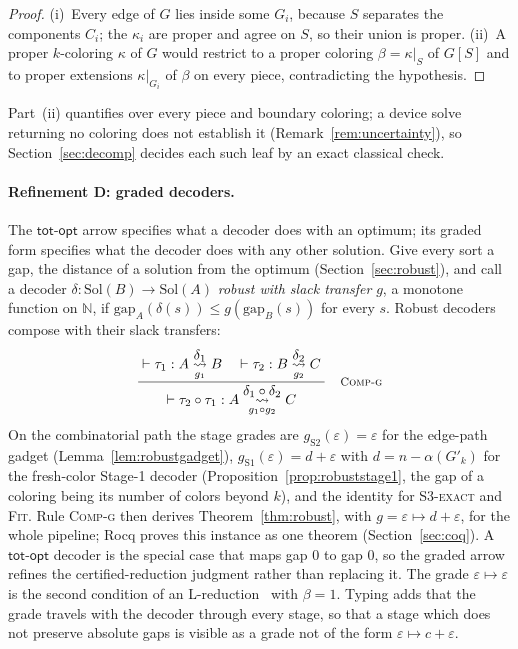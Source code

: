 \documentclass[a4paper,fleqn]{cas-sc}
\newcommand{\N}{\mathbb{N}}
\newcommand{\indep}{\alpha}
\newcommand{\Sol}{\mathrm{Sol}}
\newcommand{\totopt}{\mathsf{tot\text{-}opt}}
\newcommand{\rn}[1]{\textup{\textsc{\footnotesize #1}}}
\newcommand{\irule}[2]{\ensuremath{\dfrac{\;#1\;}{\;#2\;}}}
\newcommand{\redtos}[2]{\mathrel{\overset{\textstyle #1}{\underset{#2}{\rightsquigarrow}}}}
\begin{document}
\begin{proof}
(i)~Every edge of $G$ lies inside some $G_i$, because $S$ separates the components
$C_i$; the $\kappa_i$ are proper and agree on $S$, so their union is proper.
(ii)~A proper $k$-coloring $\kappa$ of $G$ would restrict to a proper coloring
$\beta=\kappa|_S$ of $G[S]$ and to proper extensions $\kappa|_{G_i}$ of $\beta$ on
every piece, contradicting the hypothesis.
\end{proof}

\noindent Part~(ii) quantifies over every piece and boundary coloring; a device solve
returning no coloring does not establish it (Remark~\ref{rem:uncertainty}), so
Section~\ref{sec:decomp} decides each such leaf by an exact classical check.

\paragraph{Refinement D: graded decoders.} The $\totopt$ arrow specifies what a
decoder does with an optimum; its graded form specifies what the decoder does with
any other solution.
Give every sort a gap, the distance of a solution from the optimum
(Section~\ref{sec:robust}), and call a decoder $\delta:\Sol(B)\to\Sol(A)$
\emph{robust with slack transfer} $g$, a monotone function on $\N$, if
$\mathrm{gap}_A(\delta(s))\le g(\mathrm{gap}_B(s))$ for every $s$. Robust decoders
compose with their slack transfers:
\[
  \irule{\vdash \tau_1 : A \redtos{\delta_1}{g_1} B \quad
         \vdash \tau_2 : B \redtos{\delta_2}{g_2} C}
        {\vdash \tau_2\circ\tau_1 : A \redtos{\delta_1\circ\delta_2}{g_1\circ g_2} C}
  \quad\rn{Comp-g}
\]
On the combinatorial path the stage grades are $g_{\mathrm{S2}}(\varepsilon)=
\varepsilon$ for the edge-path gadget (Lemma~\ref{lem:robustgadget}),
$g_{\mathrm{S1}}(\varepsilon)=d+\varepsilon$ with $d=n-\indep(G'_k)$ for the
fresh-color Stage-1 decoder (Proposition~\ref{prop:robuststage1}, the gap of a
coloring being its number of colors beyond $k$), and the identity for \rn{S3-exact}
and \rn{Fit}. Rule \rn{Comp-g} then derives Theorem~\ref{thm:robust}, with
$g=\varepsilon\mapsto d+\varepsilon$, for the whole pipeline; Rocq proves this
instance as one theorem (Section~\ref{sec:coq}). A $\totopt$ decoder is the special case
that maps gap $0$ to gap $0$, so the graded arrow refines the certified-reduction
judgment rather than replacing it. The grade $\varepsilon\mapsto\varepsilon$ is the
second condition of an L-reduction~\cite{PapadimitriouYannakakis1991} with $\beta=1$.
Typing adds that the grade travels with the decoder through every stage, so that a
stage which does not preserve absolute gaps is visible as a grade not of the form
$\varepsilon\mapsto c+\varepsilon$.
\end{document}
